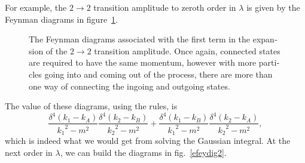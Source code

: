 \begin{english}
For example, the $2\rightarrow2$ transition amplitude to zeroth order in $\lambda$ is given by the Feynman diagrams in figure~\ref{efeydig1}.

\begin{figure}[hbt]
\begin{footnotesize}\begin{center}
\end{center}\end{footnotesize}
\caption{The Feynman diagrams associated with the first term in the expansion of the $2\rightarrow2$ transition amplitude. Once again, connected states are required to have the same momentum, however with more particles going into and coming out of the process, there are more than one way of connecting the ingoing and outgoing states.
\label{efeydig1}}
\end{figure}

The value of these diagrams, using the rules, is
\[\frac{\delta^4(k_1-k_A)}{{k_1}^2-m^2}\frac{\delta^4(k_2-k_B)}{{k_2}^2-m^2}+\frac{\delta^4(k_1-k_B)}{{k_1}^2-m^2}\frac{\delta^4(k_2-k_A)}{{k_2}^2-m^2},\]
which is indeed what we would get from solving the Gaussian integral. At the next order in $\lambda$, we can build the diagrams in fig.~\ref{efeydig2}.

\begin{figure}[hbt]
\begin{footnotesize}
\begin{minipage}{.09\textwidth}
\normalsize \hfill
\end{minipage}
\begin{minipage}{.9\textwidth}
\begin{center}
\end{center}
\end{minipage}


\end{footnotesize}
\end{figure}
\end{english}
